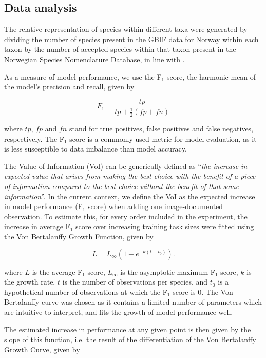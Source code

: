 \documentclass{article}
\begin{document}
\subsection*{Data analysis}
The relative representation of species within different taxa were generated by dividing the number of species present in the GBIF data for Norway within each taxon by the number of accepted species within that taxon present in the Norwegian Species Nomenclature Database\autocite{Artsnavnebase}, in line with \citeauthor{Troudet2017}\autocite{Troudet2017}.

As a measure of model performance, we use the F\(_1\) score, the harmonic mean of the model's precision and recall, given by

\[ F_1 = \frac{tp}{tp + \frac{1}{2}(fp + fn)} \]


where \(tp\), \(fp\) and \(fn\) stand for true positives, false positives and false negatives, respectively. The F\(_1\) score is a commonly used metric for model evaluation, as it is less susceptible to data imbalance than model accuracy\autocite{Goodfellow-et-al-2016}.

The Value of Information (VoI) can be generically defined as ``\textit{the increase in expected value that arises from making the best choice with the benefit of a piece of information compared to the best choice without the benefit of that same information}''\autocite{Keisler2013}. In the current context, we define the VoI as the expected increase in model performance (F\(_1\) score) when adding one image-documented observation. To estimate this, for every order included in the experiment, the increase in average F\(_1\) score over increasing training task sizes were fitted using the Von Bertalanffy Growth Function, given by

\[ L = L_\infty(1 - e^{-k(t-t_0)}). \]

where \(L\) is the average F\(_1\) score, \(L_\infty\) is the asymptotic maximum F\(_1\) score, \(k\) is the growth rate, \(t\) is the number of observations per species, and \(t_0\) is a hypothetical number of observations at which the F\(_1\) score is 0. The Von Bertalanffy curve was chosen as it contains a limited number of parameters which are intuitive to interpret, and fits the growth of model performance well.

The estimated increase in performance at any given point is then given by the slope of this function, i.e. the result of the differentiation of the Von Bertalanffy Growth Curve, given\autocite{Campbell1972} by
\end{document}
